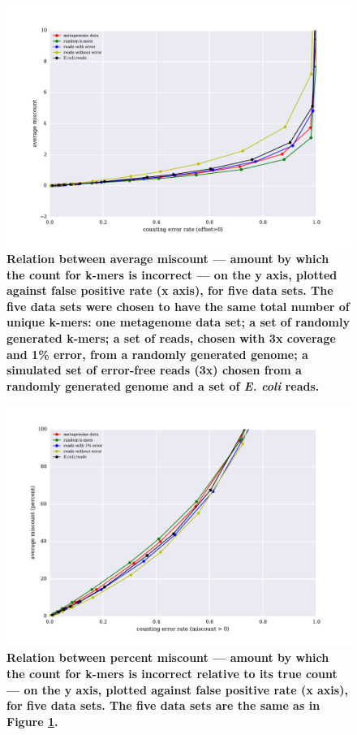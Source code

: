 \documentclass[10pt]{article}
\begin{document}
\begin{figure}[!ht]
\centerline{\includegraphics[width=5in]{./figure/average_offset_vs_fpr}}
\caption{\bf Relation between average miscount --- amount by which
the count for k-mers is incorrect --- on the y axis, plotted against
false positive rate (x axis), for five data sets.  The five data
sets were chosen to have the same total number of unique k-mers: one
metagenome data set; a set of randomly generated k-mers; a set
of reads, chosen with 3x coverage and 1\% error, from a randomly generated
genome; a simulated set of error-free reads (3x) chosen from a randomly
generated genome and a set of {\em E. coli} reads.}
\label{fig:average_offset_vs_fpr}
\end{figure}

\begin{figure}[!ht]
\centerline{\includegraphics[width=5in]{./figure/percent_offset_vs_fpr}}
\caption{\bf Relation between percent miscount --- amount by which the
  count for k-mers is incorrect relative to its true count --- on the
  y axis, plotted against false positive rate (x axis), for five data
  sets.  The five data sets are the same as in Figure
  \ref{fig:average_offset_vs_fpr}.}
\label{fig:percent_offset_vs_fpr}
\end{figure}
\end{document}

